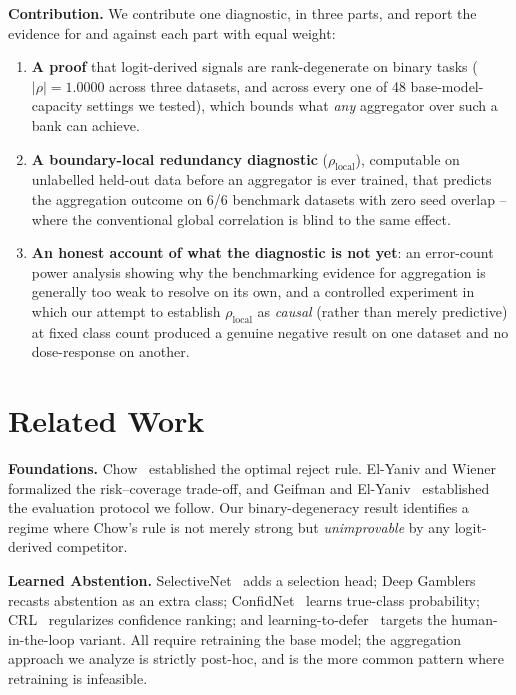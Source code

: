\documentclass[conference]{IEEEtran}
\newcommand{\rholocal}{\rho_{\mathrm{local}}}
\begin{document}
\textbf{Contribution.} We contribute one diagnostic, in three parts, and report the evidence for and against each part with equal weight:
\begin{enumerate}
  \item \textbf{A proof} that logit-derived signals are rank-degenerate on binary tasks ($|\rho|{=}1.0000$ across three datasets, and across every one of 48 base-model-capacity settings we tested), which bounds what \emph{any} aggregator over such a bank can achieve.
  \item \textbf{A boundary-local redundancy diagnostic} ($\rholocal$), computable on unlabelled held-out data before an aggregator is ever trained, that predicts the aggregation outcome on 6/6 benchmark datasets with zero seed overlap -- where the conventional global correlation is blind to the same effect.
  \item \textbf{An honest account of what the diagnostic is not yet}: an error-count power analysis showing why the benchmarking evidence for aggregation is generally too weak to resolve on its own, and a controlled experiment in which our attempt to establish $\rholocal$ as \emph{causal} (rather than merely predictive) at fixed class count produced a genuine negative result on one dataset and no dose-response on another.
\end{enumerate}

\section{Related Work}
\label{sec:related}

\textbf{Foundations.} Chow~\cite{chow1970} established the optimal reject rule. El-Yaniv and Wiener~\cite{elyaniv2010foundations} formalized the risk--coverage trade-off, and Geifman and El-Yaniv~\cite{geifman2017selective} established the evaluation protocol we follow. Our binary-degeneracy result identifies a regime where Chow's rule is not merely strong but \emph{unimprovable} by any logit-derived competitor.

\textbf{Learned Abstention.} SelectiveNet~\cite{geifman2019selectivenet} adds a selection head; Deep Gamblers~\cite{liu2019deepgamblers} recasts abstention as an extra class; ConfidNet~\cite{corbiere2019confidnet} learns true-class probability; CRL~\cite{moon2020crl} regularizes confidence ranking; and learning-to-defer~\cite{mozannar2020defer} targets the human-in-the-loop variant. All require retraining the base model; the aggregation approach we analyze is strictly post-hoc, and is the more common pattern where retraining is infeasible.
\end{document}
